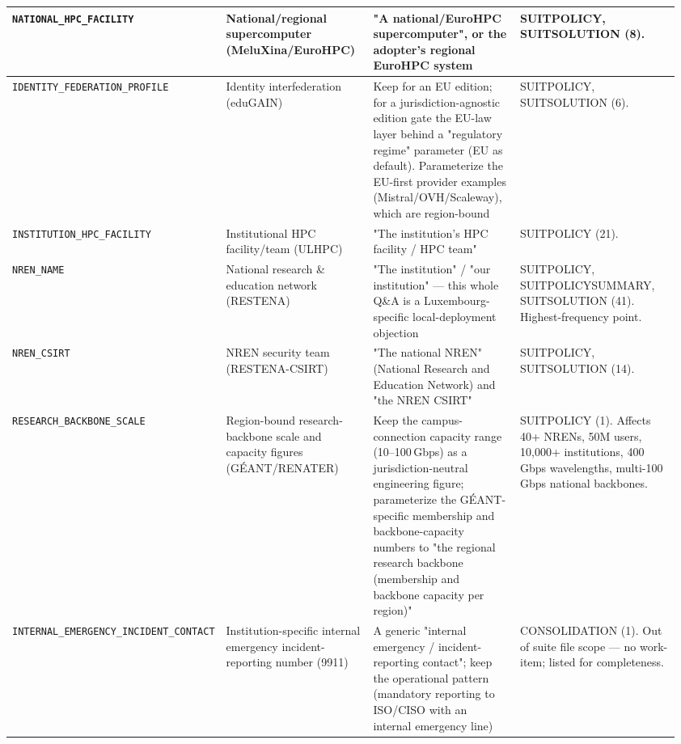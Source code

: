 \begin{center}
\begin{longtable}{@{}p{0.20\linewidth}p{0.24\linewidth}p{0.24\linewidth}p{0.28\linewidth}@{}}
\texttt{NATIONAL\_HPC\_FACILITY} &
National/regional supercomputer (MeluXina/EuroHPC) &
"A national/EuroHPC supercomputer", or the adopter's regional EuroHPC system &
SUITPOLICY, SUITSOLUTION (8).\\
\midrule

\texttt{IDENTITY\_FEDERATION\_PROFILE} &
Identity interfederation (eduGAIN) &
Keep for an EU edition; for a jurisdiction-agnostic edition gate the EU-law layer behind a "regulatory regime" parameter (EU as default). Parameterize the EU-first provider examples (Mistral/OVH/Scaleway), which are region-bound &
SUITPOLICY, SUITSOLUTION (6).\\
\midrule

\texttt{INSTITUTION\_HPC\_FACILITY} &
Institutional HPC facility/team (ULHPC) &
"The institution's HPC facility / HPC team" &
SUITPOLICY (21).\\
\midrule

\texttt{NREN\_NAME} &
National research \& education network (RESTENA) &
"The institution" / "our institution" --- this whole Q\&A is a Luxembourg-specific local-deployment objection &
SUITPOLICY, SUITPOLICYSUMMARY, SUITSOLUTION (41). Highest-frequency point.\\
\midrule

\texttt{NREN\_CSIRT} &
NREN security team (RESTENA-CSIRT) &
"The national NREN" (National Research and Education Network) and "the NREN CSIRT" &
SUITPOLICY, SUITSOLUTION (14).\\
\midrule

\texttt{RESEARCH\_BACKBONE\_SCALE} &
Region-bound research-backbone scale and capacity figures (G\'EANT/RENATER) &
Keep the campus-connection capacity range (10--100\,Gbps) as a jurisdiction-neutral engineering figure; parameterize the G\'EANT-specific membership and backbone-capacity numbers to "the regional research backbone (membership and backbone capacity per region)" &
SUITPOLICY (1). Affects 40+ NRENs, 50M users, 10,000+ institutions, 400\,Gbps wavelengths, multi-100\,Gbps national backbones.\\
\midrule

\texttt{INTERNAL\_EMERGENCY\_INCIDENT\_CONTACT} &
Institution-specific internal emergency incident-reporting number (9911) &
A generic "internal emergency / incident-reporting contact"; keep the operational pattern (mandatory reporting to ISO/CISO with an internal emergency line) &
CONSOLIDATION (1). Out of suite file scope --- no work-item; listed for completeness.\\
\midrule


\end{longtable}
\end{center}
